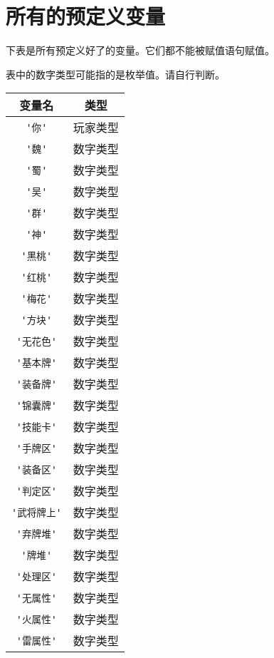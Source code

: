 \chapter{所有的预定义变量}

下表是所有预定义好了的变量。它们都不能被赋值语句赋值。

表中的数字类型可能指的是枚举值。请自行判断。

\begin{center}
\begin{longtable}{|c|c|}
\hline \textbf{变量名} & \textbf{类型} \\
\hline \verb|'你'| & 玩家类型 \\

\hline \verb|'魏'| & 数字类型 \\
\hline \verb|'蜀'| & 数字类型 \\
\hline \verb|'吴'| & 数字类型 \\
\hline \verb|'群'| & 数字类型 \\
\hline \verb|'神'| & 数字类型 \\

\hline \verb|'黑桃'| & 数字类型 \\
\hline \verb|'红桃'| & 数字类型 \\
\hline \verb|'梅花'| & 数字类型 \\
\hline \verb|'方块'| & 数字类型 \\
\hline \verb|'无花色'| & 数字类型 \\

\hline \verb|'基本牌'| & 数字类型 \\
\hline \verb|'装备牌'| & 数字类型 \\
\hline \verb|'锦囊牌'| & 数字类型 \\
\hline \verb|'技能卡'| & 数字类型 \\

\hline \verb|'手牌区'| & 数字类型 \\
\hline \verb|'装备区'| & 数字类型 \\
\hline \verb|'判定区'| & 数字类型 \\
\hline \verb|'武将牌上'| & 数字类型 \\
\hline \verb|'弃牌堆'| & 数字类型 \\
\hline \verb|'牌堆'| & 数字类型 \\
\hline \verb|'处理区'| & 数字类型 \\

\hline \verb|'无属性'| & 数字类型 \\
\hline \verb|'火属性'| & 数字类型 \\
\hline \verb|'雷属性'| & 数字类型 \\


\end{longtable}
\end{center}
